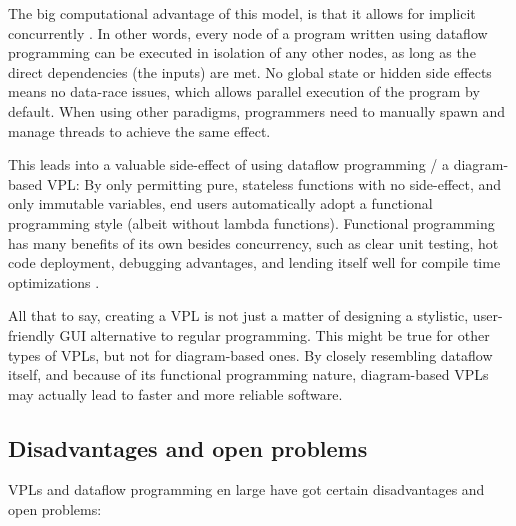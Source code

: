 The big computational advantage of this model, is that it allows for implicit concurrently \citep{sousa_dataflow_2012}. 
In other words, every node of a program written using dataflow programming can be executed in isolation of any other nodes, as long as the direct dependencies (the inputs) are met. 
No global state or hidden side effects means no data-race issues, which allows parallel execution of the program by default.
When using other paradigms, programmers need to manually spawn and manage threads to achieve the same effect. 

This leads into a valuable side-effect of using dataflow programming / a diagram-based \ac{VPL}: 
By only permitting pure, stateless functions with no side-effect, and only immutable variables, end users automatically adopt a functional programming style (albeit without lambda functions).
Functional programming has many benefits of its own besides concurrency, such as clear unit testing, hot code deployment, debugging advantages, and lending itself well for compile time optimizations \citep{akhmechet_functional_2006, elliott_tangible_2007}.




All that to say, creating a \ac{VPL} is not just a matter of designing a stylistic, user-friendly \ac{GUI} alternative to regular programming.
This might be true for other types of VPLs, but not for diagram-based ones. 
By closely resembling dataflow itself, and because of its functional programming nature, diagram-based VPLs may actually lead to faster and more reliable software.

\subsection{Disadvantages and open problems}
\label{sec:background:vpl:disadvantages}
 
\ac{VPL}s and dataflow programming en large have got certain disadvantages and open problems:

